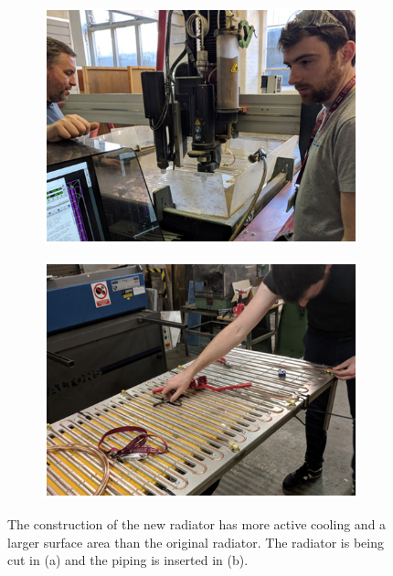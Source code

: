 \begin{figure}[!h]
\centering
\begin{subfigure}{.5\textwidth}
  \centering
  \includegraphics[width=\linewidth]{Chapter3/Figs/Raster/detCon011b_RadiatorConstruction.png}
  \captionsetup{width=.9\linewidth}
  \caption{}
  \label{subFig:detCon011b_RadiatorConstruction}
\end{subfigure}%
\begin{subfigure}{.5\textwidth}
  \centering
  \includegraphics[width=\linewidth]{Chapter3/Figs/Raster/detCon012b_RadiatorPiping.png}
  \captionsetup{width=.9\linewidth}
  \caption{}
  \label{subFig:detCon012b_RadiatorPiping}
\end{subfigure}
\caption{The construction of the new radiator has more active cooling and a larger surface area than the original radiator. The radiator is being cut in (a) and the piping is inserted in (b).}
\label{fig:detCon_RadiatorConstruction_RadiatorPiping}
\end{figure}

